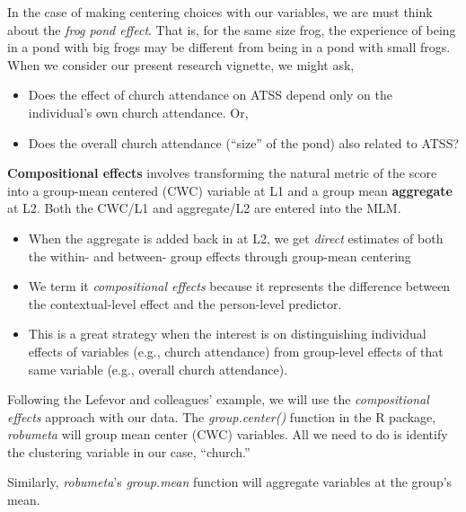 \documentclass[
  11pt,
]{book}
\newenvironment{Shaded}{\begin{snugshade}}{\end{snugshade}}
\newcommand{\CommentTok}[1]{\textcolor[rgb]{0.56,0.35,0.01}{\textit{#1}}}
\newcommand{\FunctionTok}[1]{\textcolor[rgb]{0.00,0.00,0.00}{#1}}
\newcommand{\NormalTok}[1]{#1}
\newcommand{\OtherTok}[1]{\textcolor[rgb]{0.56,0.35,0.01}{#1}}
\newcommand{\SpecialCharTok}[1]{\textcolor[rgb]{0.00,0.00,0.00}{#1}}
\providecommand{\tightlist}{%
  \setlength{\itemsep}{0pt}\setlength{\parskip}{0pt}}
\begin{document}
In the case of making centering choices with our variables, we are must think about the \emph{frog pond effect}. That is, for the same size frog, the experience of being in a pond with big frogs may be different from being in a pond with small frogs. When we consider our present research vignette, we might ask,

\begin{itemize}
\tightlist
\item
  Does the effect of church attendance on ATSS depend only on the individual's own church attendance. Or,
\item
  Does the overall church attendance (``size'' of the pond) also related to ATSS?
\end{itemize}

\textbf{Compositional effects} \citep{enders_centering_2007} involves transforming the natural metric of the score into a group-mean centered (CWC) variable at L1 and a group mean \textbf{aggregate} at L2. Both the CWC/L1 and aggregate/L2 are entered into the MLM.

\begin{itemize}
\tightlist
\item
  When the aggregate is added back in at L2, we get \emph{direct} estimates of both the within- and between- group effects through group-mean centering
\item
  We term it \emph{compositional effects} because it represents the difference between the contextual-level effect and the person-level predictor.
\item
  This is a great strategy when the interest is on distinguishing individual effects of variables (e.g., church attendance) from group-level effects of that same variable (e.g., overall church attendance).
\end{itemize}

Following the Lefevor and colleagues' \citeyearpar{lefevor_homonegativity_2020} example, we will use the \emph{compositional effects} approach with our data. The \emph{group.center()} function in the R package, \emph{robumeta} will group mean center (CWC) variables. All we need to do is identify the clustering variable in our case, ``church.''

Similarly, \emph{robumeta}'s \emph{group.mean} function will aggregate variables at the group's mean.

\begin{Shaded}
\end{Shaded}
\end{document}
